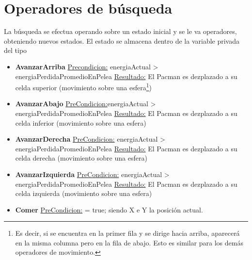\section{Operadores de búsqueda}

La búsqueda se efectua operando sobre un estado inicial y se le va 
operadores, obteniendo nuevos estados. El estado se almacena dentro de
la variable privada  del tipo 


\begin{itemize}

\item \textbf{AvanzarArriba}\newline
\underline{Precondicion:} energiaActual > energiaPerdidaPromedioEnPelea\newline
\underline{Resultado:} El Pacman es dezplazado a su celda superior (movimiento
sobre una esfera\footnote{Es decir, si se encuentra en la primer fila y se
dirige hacia arriba, aparecerá en la misma columna pero en la fila de abajo.
Esto es similar para los demás operadores de movimiento.})

\item \textbf{AvanzarAbajo}\newline
\underline{PreCondicion:}energiaActual > energiaPerdidaPromedioEnPelea
\underline{Resultado:} El Pacman es dezplazado a su celda inferior (movimiento
sobre una esfera)\newline

\item \textbf{AvanzarDerecha}\newline
\underline{PreCondicion:} energiaActual > energiaPerdidaPromedioEnPelea\newline
\underline{Resultado:} El Pacman es dezplazado a su celda derecha (movimiento
sobre una esfera)\newline

\item \textbf{AvanzarIzquierda}\newline
\underline{PreCondicion:} energiaActual > energiaPerdidaPromedioEnPelea\newline
\underline{Resultado:} El Pacman es dezplazado a su celda izquierda (movimiento
sobre una esfera)\newline

\item \textbf{Comer}\newline
\underline{PreCondicion:}  = true;
siendo X e Y la posición actual.


\end{itemize}

